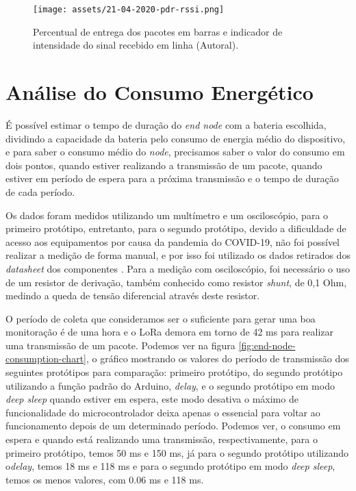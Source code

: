 \begin{figure}[H]
  \centering
  \texttt{[image: assets/21-04-2020-pdr-rssi.png]} 
  \caption{Percentual de entrega dos pacotes em barras e indicador de intensidade do sinal recebido em linha (Autoral).}
  \label{fig:21-04-2020-pdr-rssi} 
\end{figure}

\section{Análise do Consumo Energético}
\label{result:consumo}
É possível estimar o tempo de duração do \textit{end node} com a bateria escolhida, dividindo a capacidade da bateria pelo consumo de energia médio do dispositivo, e para saber o consumo médio do \textit{node}, precisamos saber o valor do consumo em dois pontos, quando estiver realizando a transmissão de um pacote,  quando estiver em período de espera para a próxima transmissão e o tempo de duração de cada período.

Os dados foram medidos utilizando um multímetro e um osciloscópio, para o primeiro protótipo, entretanto, para o segundo protótipo, devido a dificuldade de acesso aos equipamentos por causa da pandemia do COVID-19, não foi possível realizar a medição de forma manual, e por isso foi utilizado os dados retirados dos \textit{datasheet} dos componentes \cite{datasheetDHT22, datasheetATmega328P, datasheetLoRa}. Para a medição com osciloscópio, foi necessário o uso de um resistor de derivação, também conhecido como resistor \textit{shunt}, de 0,1 Ohm, medindo a queda de tensão diferencial através deste resistor.

O período de coleta que consideramos ser o suficiente para gerar uma boa monitoração é de uma hora e o LoRa demora em torno de 42 ms para realizar uma transmissão de um pacote. Podemos ver na figura \ref{fig:end-node-consumption-chart}, o gráfico mostrando os valores do período de transmissão dos seguintes protótipos para comparação: primeiro protótipo, do segundo protótipo utilizando a função padrão do Arduino, \textit{delay}, e o segundo protótipo em modo \textit{deep sleep} quando estiver em espera, este modo desativa o máximo de funcionalidade do microcontrolador deixa apenas o essencial para voltar ao funcionamento depois de um determinado período. Podemos ver, o consumo em espera e quando está realizando uma transmissão, respectivamente, para o primeiro protótipo, temos 50 ms e 150 ms, já para o segundo protótipo utilizando o\textit{delay}, temos 18 ms e 118 ms e para o segundo protótipo em modo  \textit{deep sleep}, temos os menos valores, com 0.06 ms e 118 ms.

